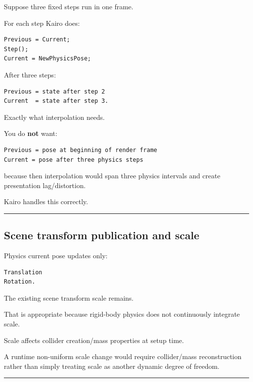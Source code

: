 Suppose three fixed steps run in one frame.

For each step Kairo does:

\begin{verbatim}
Previous = Current;
Step();
Current = NewPhysicsPose;
\end{verbatim}

After three steps:

\begin{verbatim}
Previous = state after step 2
Current  = state after step 3.
\end{verbatim}

Exactly what interpolation needs.

You do \textbf{not} want:

\begin{verbatim}
Previous = pose at beginning of render frame
Current = pose after three physics steps
\end{verbatim}

because then interpolation would span three physics intervals and create presentation lag/distortion.

Kairo handles this correctly.

\begin{center}\rule{0.5\linewidth}{0.5pt}\end{center}

\subsection{Scene transform publication and scale}\label{06-engine-ii-ch038-scene-transform-publication-and-scale}

\hypertarget{06-engine-ii-ch038-scene-transform-publication-and-scale}{}

Physics current pose updates only:

\begin{verbatim}
Translation
Rotation.
\end{verbatim}

The existing scene transform scale remains.

That is appropriate because rigid-body physics does not continuously integrate scale.

Scale affects collider creation/mass properties at setup time.

A runtime non-uniform scale change would require collider/mass reconstruction rather than simply treating scale as another dynamic degree of freedom.

\begin{center}\rule{0.5\linewidth}{0.5pt}\end{center}

